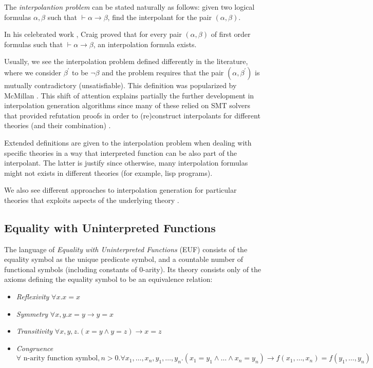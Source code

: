 \documentclass[sigconf,authordraft]{acmart}
\begin{document}
The \emph{interpolantion problem} can be stated naturally as follows: given two
logical formulas $\alpha, \beta$ such that $\vdash \alpha \rightarrow \beta$, find
the interpolant for the pair $(\alpha, \beta)$.

In his celebrated work \cite{10.2307/2963594}, Craig proved that for every pair
$(\alpha, \beta)$ of first order formulas such that
$\vdash \alpha \rightarrow \beta$, an interpolation formula exists.

Usually, we see the interpolation problem defined differently in the literature, where
we consider $\beta^{'}$ to be $\neg \beta$ and the problem requires that the pair $(\alpha, \beta^{'})$
is mutually contradictory (unsatisfiable). This definition was popularized by McMillan
\cite{10.1007/978-3-540-24730-2_2}. This shift of attention explains partially the further
development in interpolation generation algorithms since many of these relied on
SMT solvers that provided refutation proofs in order to (re)construct interpolants
for different theories (and their combination) \cite{10.1007/978-3-642-02959-2_17,
  10.1007/978-3-642-36742-7_9, mcmillan2011interpolants}.

Extended definitions are given to the interpolation problem when dealing with specific
theories \cite{10.1007/11532231_26} in a way that interpreted function can be also part of
the interpolant. The latter is justify since otherwise, many interpolation formulas might
not exists in different theories (for example, lisp programs).

We also see different approaches to interpolation generation for particular
theories that exploits aspects of the underlying theory \cite{}.

\subsection{Equality with Uninterpreted Functions}

The language of \emph{Equality with Uninterpreted Functions} (EUF) consists of the
equality symbol as the unique predicate symbol, and a countable number of functional
symbols (including constants of 0-arity). Its theory consists only of the axioms
defining the equality symbol to be an equivalence relation:

\begin{itemize}
\item \emph{Reflexivity} $\forall x . x = x$
\item \emph{Symmetry} $\forall x, y . x = y \rightarrow y = x$
\item \emph{Transitivity} $\forall x, y, z . (x = y \land y = z) \rightarrow x = z$
\item \emph{Congruence} $\forall \text{ n-arity function symbol}, n > 0 . \forall x_1,
  \dots, x_n, y_1, \dots, y_n . (x_1 = y_1 \land \dots \land x_n = y_n) \rightarrow
  f(x_1, \dots, x_n) = f(y_1, \dots, y_n)$
\end{itemize}
\end{document}

